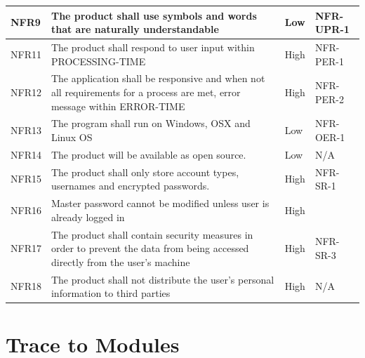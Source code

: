 \documentclass[12pt, titlepage]{article}
\begin{document}
\begin{table}[!htbp]
    \begin{tabularx}{\textwidth}{p{2cm}Xp{2cm}X}
        \midrule

        NFR9  & The product shall use symbols and words that are naturally understandable & Low & NFR-UPR-1\\\hline
        NFR11 & The product shall respond to user input within PROCESSING-TIME & High & NFR-PER-1\\\hline
        NFR12 & The application shall be responsive and when not all requirements for a process are met, error message within ERROR-TIME & High & NFR-PER-2\\\hline
        NFR13 & The program shall run on Windows, OSX and Linux OS & Low & NFR-OER-1\\\hline
        NFR14 & The product will be available as open source. & Low & N/A\\\hline
        NFR15 & The product shall only store account types, usernames and encrypted passwords. & High & NFR-SR-1\\\hline
        NFR16 & Master password cannot be modified unless user is already logged in & High & \? \\\hline
        NFR17 & The product shall contain security measures in order to prevent the data from being accessed directly from the user’s machine & High & NFR-SR-3\\\hline
        NFR18 & The product shall not distribute the user’s personal information to third parties & High & N/A\\

        \bottomrule

    \end{tabularx}
\end{table}
		
\section{Trace to Modules}	
\end{document}

